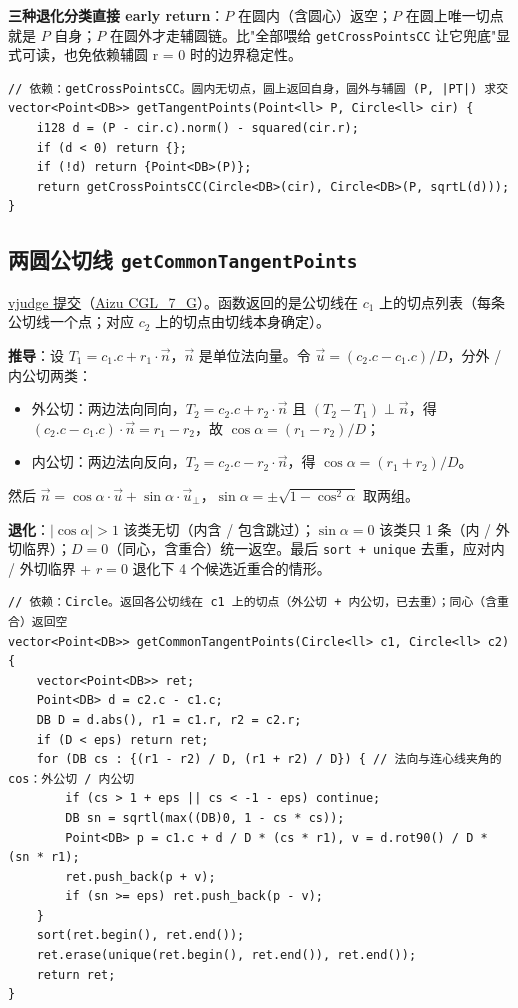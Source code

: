 		\textbf{三种退化分类直接 early return}：$P$ 在圆内（含圆心）返空；$P$ 在圆上唯一切点就是 $P$ 自身；$P$ 在圆外才走辅圆链。比"全部喂给 \texttt{getCrossPointsCC} 让它兜底"显式可读，也免依赖辅圆 r = 0 时的边界稳定性。

\begin{verbatim}
// 依赖：getCrossPointsCC。圆内无切点，圆上返回自身，圆外与辅圆 (P, |PT|) 求交
vector<Point<DB>> getTangentPoints(Point<ll> P, Circle<ll> cir) {
	i128 d = (P - cir.c).norm() - squared(cir.r);
	if (d < 0) return {};
	if (!d) return {Point<DB>(P)};
	return getCrossPointsCC(Circle<DB>(cir), Circle<DB>(P, sqrtL(d)));
}
\end{verbatim}

		\subsection{两圆公切线 \texttt{getCommonTangentPoints}}

		\href{https://vjudge.net/solution/69929554}{vjudge 提交}（\href{https://vjudge.net/problem/Aizu-CGL_7_G}{Aizu CGL\_7\_G}）。函数返回的是公切线在 $c_1$ 上的切点列表（每条公切线一个点；对应 $c_2$ 上的切点由切线本身确定）。

		\textbf{推导}：设 $T_1 = c_1.c + r_1 \cdot \vec{n}$，$\vec{n}$ 是单位法向量。令 $\vec{u} = (c_2.c - c_1.c) / D$，分外 / 内公切两类：
		\begin{itemize}
			\setlength\itemsep{0pt}
			\item 外公切：两边法向同向，$T_2 = c_2.c + r_2 \cdot \vec{n}$ 且 $(T_2 - T_1) \perp \vec{n}$，得 $(c_2.c - c_1.c) \cdot \vec{n} = r_1 - r_2$，故 $\cos \alpha = (r_1 - r_2) / D$；
			\item 内公切：两边法向反向，$T_2 = c_2.c - r_2 \cdot \vec{n}$，得 $\cos \alpha = (r_1 + r_2) / D$。
		\end{itemize}
		然后 $\vec{n} = \cos \alpha \cdot \vec{u} + \sin \alpha \cdot \vec{u}_\perp$，$\sin \alpha = \pm \sqrt{1 - \cos^2 \alpha}$ 取两组。

		\textbf{退化}：$|\cos \alpha| > 1$ 该类无切（内含 / 包含跳过）；$\sin \alpha = 0$ 该类只 1 条（内 / 外切临界）；$D = 0$（同心，含重合）统一返空。最后 \texttt{sort + unique} 去重，应对内 / 外切临界 + $r = 0$ 退化下 4 个候选近重合的情形。

\begin{verbatim}
// 依赖：Circle。返回各公切线在 c1 上的切点（外公切 + 内公切，已去重）；同心（含重合）返回空
vector<Point<DB>> getCommonTangentPoints(Circle<ll> c1, Circle<ll> c2) {
	vector<Point<DB>> ret;
	Point<DB> d = c2.c - c1.c;
	DB D = d.abs(), r1 = c1.r, r2 = c2.r;
	if (D < eps) return ret;
	for (DB cs : {(r1 - r2) / D, (r1 + r2) / D}) { // 法向与连心线夹角的 cos：外公切 / 内公切
		if (cs > 1 + eps || cs < -1 - eps) continue;
		DB sn = sqrtl(max((DB)0, 1 - cs * cs));
		Point<DB> p = c1.c + d / D * (cs * r1), v = d.rot90() / D * (sn * r1);
		ret.push_back(p + v);
		if (sn >= eps) ret.push_back(p - v);
	}
	sort(ret.begin(), ret.end());
	ret.erase(unique(ret.begin(), ret.end()), ret.end());
	return ret;
}
\end{verbatim}

